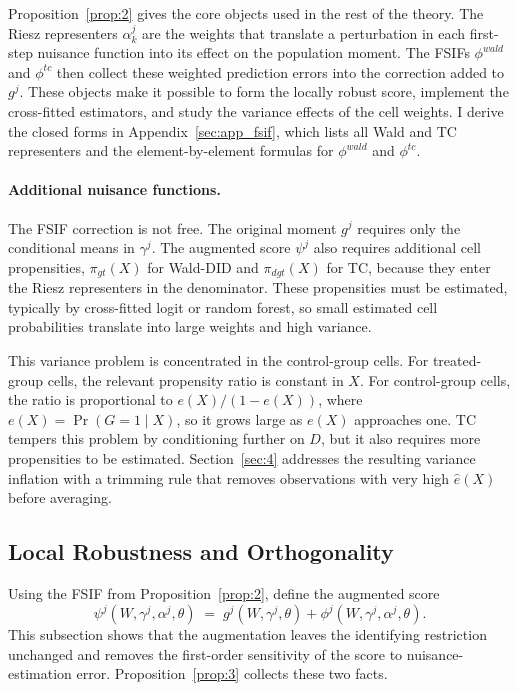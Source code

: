 Proposition~\ref{prop:2} gives the core objects used in the rest of the theory. The Riesz representers $\alpha^j_k$ are the weights that translate a perturbation in each first-step nuisance function into its effect on the population moment. The FSIFs $\phi^{wald}$ and $\phi^{tc}$ then collect these weighted prediction errors into the correction added to $g^j$. These objects make it possible to form the locally robust score, implement the cross-fitted estimators, and study the variance effects of the cell weights. I derive the closed forms in Appendix~\ref{sec:app_fsif}, which lists all Wald and TC representers and the element-by-element formulas for $\phi^{wald}$ and $\phi^{tc}$.

\paragraph{Additional nuisance functions.} The FSIF correction is not free. The original moment $g^j$ requires only the conditional means in $\gamma^j$. The augmented score $\psi^j$ also requires additional cell propensities, $\pi_{gt}(X)$ for Wald-DID and $\pi_{dgt}(X)$ for TC, because they enter the Riesz representers in the denominator. These propensities must be estimated, typically by cross-fitted logit or random forest, so small estimated cell probabilities translate into large weights and high variance.

This variance problem is concentrated in the control-group cells. For treated-group cells, the relevant propensity ratio is constant in $X$. For control-group cells, the ratio is proportional to $e(X)/(1-e(X))$, where $e(X)=\Pr(G=1\mid X)$, so it grows large as $e(X)$ approaches one. TC tempers this problem by conditioning further on $D$, but it also requires more propensities to be estimated. Section~\ref{sec:4} addresses the resulting variance inflation with a trimming rule that removes observations with very high $\hat e(X)$ before averaging.


\subsection{Local Robustness and Orthogonality}\label{sec:3c}

Using the FSIF from Proposition~\ref{prop:2}, define the augmented score
\begin{equation}\label{eq:orth_score}
    \psi^{j}(W,\gamma^j,\alpha^j,\theta)
    \;=\;
    g^{j}(W,\gamma^j,\theta)
    +
    \phi^{j}(W,\gamma^j,\alpha^j,\theta).
\end{equation}
This subsection shows that the augmentation leaves the identifying restriction unchanged and removes the first-order sensitivity of the score to nuisance-estimation error. Proposition~\ref{prop:3} collects these two facts.

